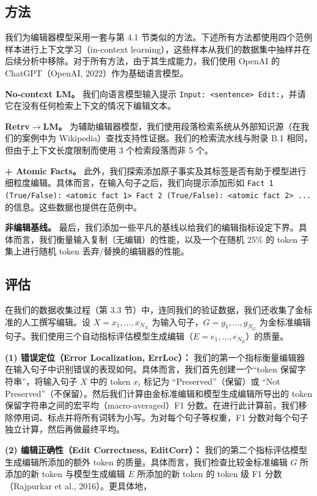\documentclass[11pt,UTF8,fontset=fandol]{ctexart}
\begin{document}
\subsection{方法}

我们为编辑器模型采用一套与第 4.1 节类似的方法。下述所有方法都使用四个范例样本进行上下文学习（in-context learning），这些样本从我们的数据集中抽样并在后续分析中移除。对于所有方法，由于其生成能力，我们使用 OpenAI 的 ChatGPT（OpenAI, 2022）作为基础语言模型。

\textbf{No-context LM。} 我们向语言模型输入提示 \texttt{Input: <sentence> Edit:}，并请它在没有任何检索上下文的情况下编辑文本。

\textbf{Retrv$\rightarrow$LM。} 为辅助编辑器模型，我们使用段落检索系统从外部知识源（在我们的案例中为 Wikipedia）查找支持性证据。我们的检索流水线与附录 B.1 相同，但由于上下文长度限制而使用 3 个检索段落而非 5 个。

\textbf{+ Atomic Facts。} 此外，我们探索添加原子事实及其标签是否有助于模型进行细粒度编辑。具体而言，在输入句子之后，我们向提示添加形如 \texttt{Fact 1 (True/False): <atomic fact 1> Fact 2 (True/False): <atomic fact 2> ...} 的信息。这些数据也提供在范例中。

\textbf{非编辑基线。} 最后，我们添加一些平凡的基线以给我们的编辑指标设定下界。具体而言，我们衡量输入复制（无编辑）的性能，以及一个在随机 25\% 的 token 子集上进行随机 token 丢弃/替换的编辑器的性能。

\subsection{评估}

在我们的数据收集过程（第 3.3 节）中，连同我们的验证数据，我们还收集了金标准的人工撰写编辑。设 $X = x_1, \ldots, x_{N_X}$ 为输入句子，$G = g_1, \ldots, g_{N_G}$ 为金标准编辑句子。我们使用三个自动指标评估模型生成编辑（$E = e_1, \ldots, e_{N_E}$）的质量。

\textbf{(1) 错误定位（Error Localization, ErrLoc）：} 我们的第一个指标衡量编辑器在输入句子中识别错误的表现如何。具体而言，我们首先创建一个“token 保留字符串”，将输入句子 $X$ 中的 token $x_i$ 标记为 “Preserved”（保留）或 “Not Preserved”（不保留）。然后我们计算由金标准编辑和模型生成编辑所导出的 token 保留字符串之间的宏平均（macro-averaged）F1 分数。在进行此计算前，我们移除停用词、标点并将所有词转为小写。为对每个句子等权重，F1 分数对每个句子独立计算，然后再做最终平均。

\textbf{(2) 编辑正确性（Edit Correctness, EditCorr）：} 我们的第二个指标评估模型生成编辑所添加的额外 token 的质量。具体而言，我们检查比较金标准编辑 $G$ 所添加的新 token 与模型生成编辑 $E$ 所添加的新 token 的 token 级 F1 分数（Rajpurkar et al., 2016）。更具体地，
\end{document}
